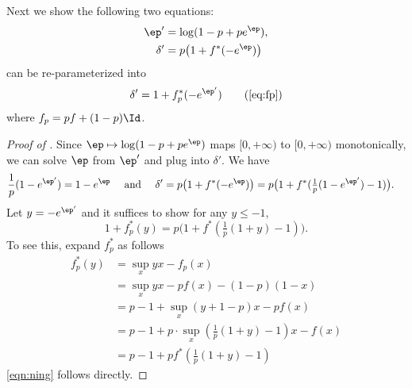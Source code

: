 Next we show the following two equations:
	\begin{align*}
		\ep'&=\log(1-p + pe^\ep),\\
		\delta'&=p\big(1+f^*(-e^{\ep})\big)
	\end{align*}
	can be re-parameterized into 
	\begin{equation}
		\delta'=1+f_p^*(-e^{\ep'})\tag{\ref{eq:fp}}
	\end{equation}
	where $f_p = pf+(1-p)\Id$.
\begin{proof}[Proof of ]
	
	Since $\ep\mapsto\log(1-p + pe^\ep)$ maps $[0,+\infty)$ to $[0,+\infty)$ monotonically, we can solve $\ep$ from $\ep'$ and plug into $\delta'$. We have
	\begin{align*}
		\frac{1}{p}(1-e^{\ep'}) = 1-e^{\ep} \quad\text{ and }\quad
		\delta'=p\big(1+f^*(-e^{\ep})\big)
		&=p\big(1+f^*(\tfrac{1}{p}(1-e^{\ep'})-1)\big).
	\end{align*}
	Let $y = -e^{\ep'}$ and it suffices to show for any $y\leqslant-1$,
	\begin{equation}\label{eqn:ning}
		1+f_p^*(y) = p\big(1+f^*(\tfrac{1}{p}(1+y)-1)\big).
	\end{equation}
	To see this, expand $f_p^*$ as follows
	\begin{align*}
		f_p^*(y) &= \sup_{x} yx-f_p(x)\\
		&=\sup_{x} yx-pf(x)-(1-p)(1-x)\\
		&=p-1  + \sup_{x} (y+1-p)x -pf(x)\\
		&=p-1  + p\cdot\sup_{x} (\tfrac{1}{p}(1+y)-1)x -f(x)\\
		&=p-1 +pf^*(\tfrac{1}{p}(1+y)-1)
	\end{align*}
	\eqref{eqn:ning} follows directly.
\end{proof}


